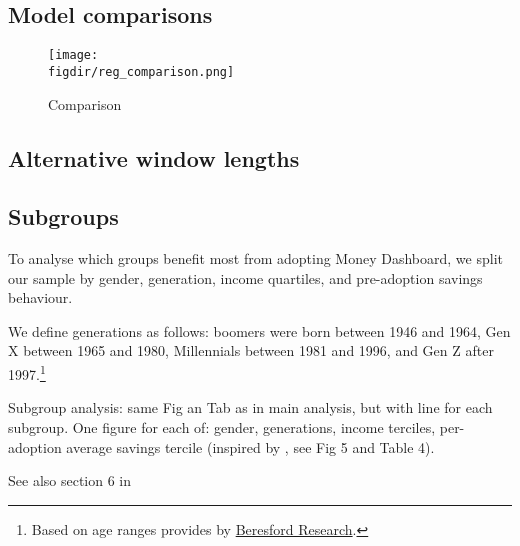 \subsection{Model comparisons}%
\label{sub:model_comparisons}

\begin{figure}[htpb]
    \centering
    \caption{Comparison}%
    \texttt{[image: \\figdir/reg\_comparison.png]}
    \label{fig:reg_comparison}
\end{figure}





\subsection{Alternative window lengths}%
\label{sub:alternative_window_lengths}

\subsection{Subgroups}%
\label{sub:subgroups}

To analyse which groups benefit most from adopting Money Dashboard, we split
our sample by gender, generation, income quartiles, and pre-adoption savings
behaviour.

We define generations as follows: boomers were born between 1946 and 1964, Gen
X between 1965 and 1980, Millennials between 1981 and 1996, and Gen Z after
1997.\footnote{Based on age ranges provides by
    \href{https://www.beresfordresearch.com/age-range-by-generation/}{Beresford
Research}.}

Subgroup analysis: same Fig an Tab as in main analysis, but with line for each
subgroup. One figure for each of: gender, generations, income terciles,
per-adoption average savings tercile (inspired by \citet{carlin2017fintech},
see Fig 5 and Table 4).

See also section 6 in \citet{gargano2021goal}

